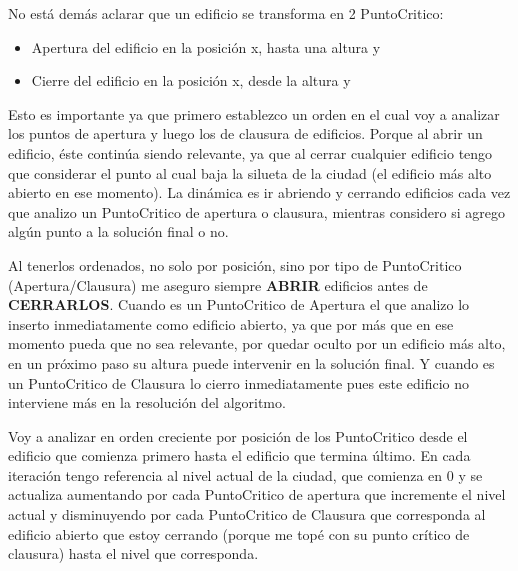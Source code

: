 No está demás aclarar que un edificio se transforma en 2 PuntoCritico:
	\begin{itemize}
		\item Apertura del edificio en la posición x, hasta una altura y
		\item Cierre del edificio en la posición x, desde la altura y
	\end{itemize}

Esto es importante ya que primero establezco un orden en el cual voy a analizar los puntos de apertura y luego los de clausura de edificios. Porque al abrir un edificio, \'este continúa siendo relevante, ya que al cerrar cualquier edificio tengo que considerar el punto al cual baja la silueta de la ciudad (el edificio más alto abierto en ese momento). La dinámica es ir abriendo y cerrando edificios cada vez que analizo un PuntoCritico de apertura o clausura, mientras considero si agrego alg\'un punto a la solución final o no.

Al tenerlos ordenados, no solo por posición, sino por tipo de PuntoCritico (Apertura/Clausura) me aseguro siempre \textbf{ABRIR} edificios antes de \textbf{CERRARLOS}. Cuando es un PuntoCritico de Apertura el que analizo lo inserto inmediatamente como edificio abierto, ya que por m\'as que en ese momento pueda que no sea relevante, por quedar oculto por un edificio más alto, en un próximo paso su altura puede intervenir en la solución final.
Y cuando es un PuntoCritico de Clausura lo cierro inmediatamente pues este edificio no interviene más en la resolución del algoritmo.

Voy a analizar en orden creciente por posici\'on de los PuntoCritico desde el edificio que comienza primero hasta el edificio que termina último.
En cada iteración tengo referencia al nivel actual de la ciudad, que comienza en 0 y se actualiza aumentando por cada PuntoCritico de apertura que incremente el nivel actual y disminuyendo por cada PuntoCritico de Clausura que corresponda al edificio abierto que estoy cerrando (porque me topé con su punto crítico de clausura) hasta el nivel que corresponda.


